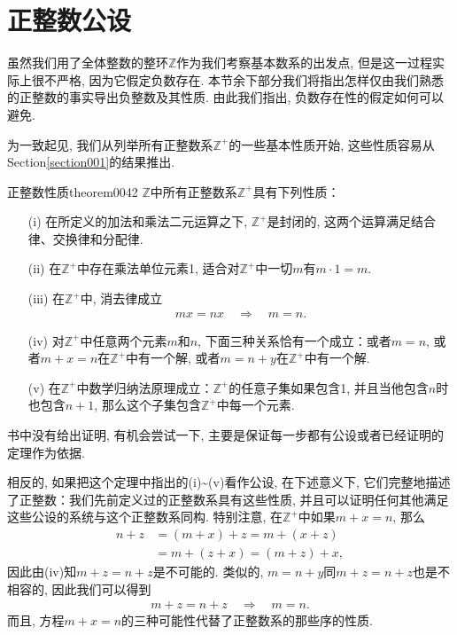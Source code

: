 \section{正整数公设}\label{section00205}
虽然我们用了全体整数的整环$\mathbb{Z}$作为我们考察基本数系的出发点, 但是这一过程实际上很不严格, 因为它假定负数存在. 本节余下部分我们将指出怎样仅由我们熟悉的正整数的事实导出负整数及其性质. 由此我们指出, 负数存在性的假定如何可以避免. 

为一致起见, 我们从列举所有正整数系$\mathbb{Z}^+$的一些基本性质开始, 这些性质容易从Section\ref{section001}的结果推出. 
\begin{theorem}{正整数性质}{theorem0042}
$\mathbb{Z}$中所有正整数系$\mathbb{Z}^+$具有下列性质：
\begin{enumerate}
\item[(i)] 在所定义的加法和乘法二元运算之下, $\mathbb{Z}^+$是封闭的, 这两个运算满足结合律、交换律和分配律. 
\item[(ii)] 在$\mathbb{Z}^+$中存在乘法单位元素1, 适合对$\mathbb{Z}^+$中一切$m$有$m \cdot 1 = m$. 
\item[(iii)] 在$\mathbb{Z}^+$中, 消去律成立
\begin{gather}\label{equation0040}
mx=nx\quad\Rightarrow\quad m=n.
\end{gather}
\item[(iv)] 对$\mathbb{Z}^+$中任意两个元素$m$和$n$, 下面三种关系恰有一个成立：或者$m=n$, 或者$m+x=n$在$\mathbb{Z}^+$中有一个解, 或者$m=n+y$在$\mathbb{Z}^+$中有一个解. 
\item[(v)] 在$\mathbb{Z}^+$中数学归纳法原理成立：$\mathbb{Z}^+$的任意子集如果包含1, 并且当他包含$n$时也包含$n+1$, 那么这个子集包含$\mathbb{Z}^+$中每一个元素. 
\end{enumerate}
\end{theorem}

书中没有给出证明, 有机会尝试一下, 主要是保证每一步都有公设或者已经证明的定理作为依据. 

相反的, 如果把这个定理中指出的(i)\textasciitilde(v)看作公设, 在下述意义下, 它们完整地描述了正整数：我们先前定义过的正整数系具有这些性质, 并且可以证明任何其他满足这些公设的系统与这个正整数系同构. 特别注意, 在$\mathbb{Z}^+$中如果$m+x=n$, 那么
\[
\begin{aligned}
n+z &= (m+x)+z = m+(x+z)\\
&=m+(z+x) = (m+z)+x,
\end{aligned}
\]
因此由(iv)知$m+z=n+z$是不可能的. 类似的, $m=n+y$同$m+z=n+z$也是不相容的, 因此我们可以得到
\begin{gather}\label{equation0041}
m+z=n+z \quad \Rightarrow\quad m=n.
\end{gather}
而且, 方程$m+x=n$的三种可能性代替了正整数系的那些序的性质. 

